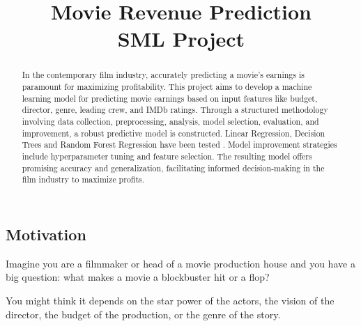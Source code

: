 \documentclass[conference]{IEEEtran}
\begin{document}
\title{Movie Revenue Prediction\\ SML Project}

\author{
     \vspace*{3.0pt}
    \and
     \vspace*{3.0pt}
}


\maketitle

\begin{abstract}
    In the contemporary film industry, accurately predicting a movie's earnings is paramount for maximizing profitability. This project aims to develop a machine learning model for predicting movie earnings based on input features like budget, director, genre, leading crew, and IMDb ratings. Through a structured methodology involving data collection, preprocessing, analysis, model selection, evaluation, and improvement, a robust predictive model is constructed. Linear Regression, Decision Trees and Random Forest Regression have been tested . Model improvement strategies include hyperparameter tuning and feature selection. The resulting model offers promising accuracy and generalization, facilitating informed decision-making in the film industry to maximize profits.
\end{abstract}

\IEEEpeerreviewmaketitle

    \subsection{Motivation}
        Imagine you are a filmmaker or head of a movie production house and you have a big question: what makes a movie a blockbuster hit or a flop?

        You might think it depends on the star power of the actors, the vision of the director, the budget of the production, or the genre of the story.
\end{document}
